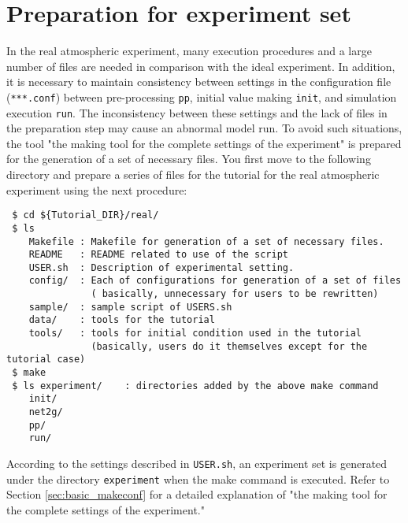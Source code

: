 \section{Preparation for experiment set} \label{sec:tutrial_real_prep}

In the real atmospheric experiment,
many execution procedures and a large number of files are needed in comparison with the ideal experiment.
In addition, it is necessary to maintain consistency between settings in the configuration file (\verb|***.conf|)
between pre-processing \verb|pp|, initial value making \verb|init|, and simulation execution \verb|run|.
The inconsistency between these settings and the lack of files in the preparation step may cause an abnormal model run.
To avoid such situations, the tool "the making tool for the complete settings of the experiment"
is prepared for the generation of a set of necessary files.
You first move to the following directory and prepare a series of files for the tutorial for the real atmospheric experiment using the next procedure:
\begin{verbatim}
 $ cd ${Tutorial_DIR}/real/
 $ ls
    Makefile : Makefile for generation of a set of necessary files.
    README   : README related to use of the script
    USER.sh  : Description of experimental setting.
    config/  : Each of configurations for generation of a set of files
               ( basically, unnecessary for users to be rewritten)
    sample/  : sample script of USERS.sh
    data/    : tools for the tutorial
    tools/   : tools for initial condition used in the tutorial 
               (basically, users do it themselves except for the tutorial case)
 $ make
 $ ls experiment/    : directories added by the above make command
    init/
    net2g/
    pp/
    run/
\end{verbatim}

According to the settings described in \verb|USER.sh|,
an experiment set is generated under the directory \verb|experiment| when the make command is executed.
Refer to Section \ref{sec:basic_makeconf} for a detailed explanation of "the making tool for the complete settings of the experiment."

